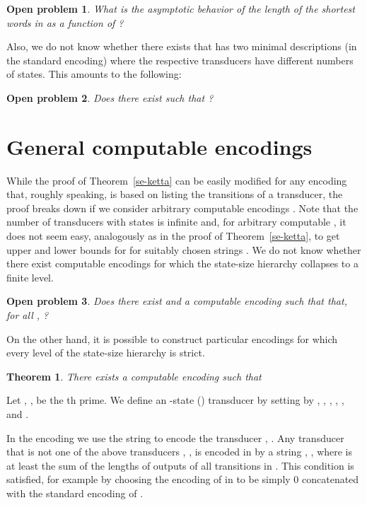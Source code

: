 \documentclass[copyright]{eptcs}
\def \proof{\bigbreak\noindent{\bf Proof.\ \ }}
\newtheorem{theorem}{T\/heorem}[section]
\newtheorem{open}{Open problem}
\begin{document}
\begin{open}
\label{pituus}
What is the asymptotic behavior of the length of the shortest words
in  
as a function
of ?
\end{open}

Also, we do not know whether there exists 
that has two minimal descriptions 
(in the standard encoding) where the respective transducers
have different numbers of states. This amounts to the following:

\begin{open}
\label{se-ketta4}
Does there exist  such that
?
\end{open}

\section{General computable encodings}
\label{sec-viisi}

While the proof of Theorem~\ref{se-ketta} can be easily modified
for any encoding that, roughly speaking, is based on listing
the transitions of a transducer, the proof breaks down if we consider
arbitrary computable encodings .
Note that the number of transducers with  states is infinite
and, for arbitrary computable , it does not seem easy, 
analogously as in the proof of Theorem~\ref{se-ketta}, to get
upper and lower bounds for  for suitably chosen
strings .
We do not know whether there exist computable encodings
for which the state-size hierarchy collapses to a finite level.

\begin{open}
\label{se-tatta}
Does there exist  and a computable encoding  such that
that, for all , ?
\end{open}

On the other hand, it is possible to construct particular
encodings 
for which every level of the state-size hierarchy 
is strict.

\begin{theorem}
\label{se-tatta2}
There exists a computable encoding
 such that

\end{theorem}
\proof
Let , , be the th prime.
We define
an -state () transducer
 by setting
by , ,
, ,
, and .

In the encoding  we use the string  to encode
the transducer , .
Any transducer  that is not one of the
above transducers , , is encoded in
 by a string , , where 
is at least the  sum of the lengths of outputs
of all transitions in . This condition is satisfied, for example
by choosing the encoding of  in  to be simply 0 concatenated
with the
standard encoding of .
\end{document}

